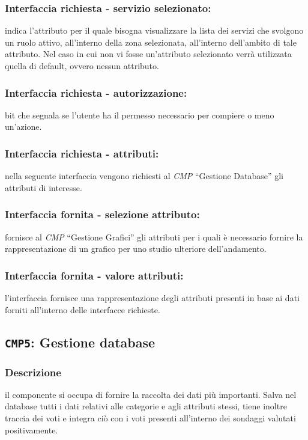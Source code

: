         \subsubsection{Interfaccia richiesta - servizio selezionato:}
            indica l'attributo per il quale bisogna visualizzare la lista dei servizi che svolgono un ruolo attivo, all'interno della zona selezionata, all'interno dell'ambito di tale attributo. Nel caso in cui non vi fosse un'attributo selezionato verrà utilizzata quella di default, ovvero nessun attributo.
        \subsubsection{Interfaccia richiesta - autorizzazione:}
            bit che segnala se l'utente ha il permesso necessario per compiere o meno un'azione.
        \subsubsection{Interfaccia richiesta - attributi:}
            nella seguente interfaccia vengono richiesti al \textit{CMP} ``Gestione Database'' gli attributi di  interesse.
        \subsubsection{Interfaccia fornita - selezione attributo:}
            fornisce al \textit{CMP} ``Gestione Grafici'' gli attributi per i quali è necessario fornire la rappresentazione di un grafico per uno studio ulteriore dell'andamento.
        \subsubsection{Interfaccia fornita - valore attributi:}
            l'interfaccia fornisce una rappresentazione degli attributi presenti in base ai dati forniti all'interno delle interfacce richieste.

    \subsection{\texttt{CMP5}: Gestione database}
        \subsubsection{Descrizione} 
            il componente si occupa di fornire la raccolta dei dati più importanti. Salva nel database tutti i dati relativi alle categorie e agli attributi stessi, tiene inoltre traccia dei voti e integra ciò con i voti presenti all'interno dei sondaggi valutati positivamente.
